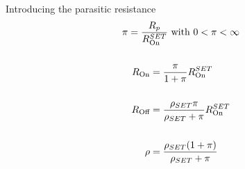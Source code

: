\documentclass[../main.tex]{subfiles}
\begin{document}
\begin{frame}{Introducing the parasitic resistance}
\begin{gather*}
    \pi = \frac{R_{p}}{R_{\text{On}}^{SET}} \text{ with } 0 < \pi < \infty\\
    \\
\begin{split}
    R_{\text{On}}
    &= \frac{\pi}{1 + \pi} R_{\text{On}}^{SET}\\
    \\
    R_{\text{Off}}
    &= \frac{\rho_{SET}\pi}{\rho_{SET} + \pi}R_{\text{On}}^{SET}\\
    \\
    \rho
    &= \frac{\rho_{SET}(1 + \pi)}{\rho_{SET} + \pi}
\end{split}
\end{gather*}
\end{frame}

%
%
%


%
%
%
\end{document}
